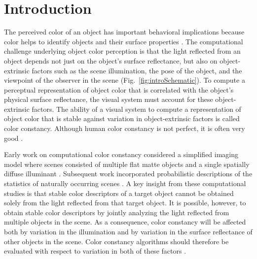 \documentclass{jov}
\begin{document}
\maketitle

\section{Introduction}
The perceived color of an object has important behavioral implications because color helps to identify objects and their surface properties \cite{Mollon89, Jacobs81}.
The computational challenge underlying object color perception is that the light reflected from an object depends not just on the object's surface reflectance, but also 
on object-extrinsic factors such as the scene illumination, the pose of the object, and the viewpoint of the observer in the scene (Fig.~\ref{fig:introSchematic}).
To compute a perceptual representation of object color that is correlated with the object's physical surface reflectance, the visual system must account for these object-extrinsic factors.
The ability of a visual system to compute a representation of object color that is stable against variation in object-extrinsic factors is called color constancy. 
Although human color constancy is not perfect, it is often very good \cite{FosterColorConstancy, BrainardColorConstancy}. 

Early work on computational color constancy considered a simplified imaging model where scenes consisted of multiple flat matte objects and a single spatially diffuse illuminant \cite{LandRetinex,Buchsbaum80,MaloneyWandell86}.
Subsequent work incorporated probabilistic descriptions of the statistics of naturally occurring scenes \cite{D'ZmuraConstancy3, D'ZmuraIversonSinger,BrainardFreeman}.
A key insight from these computational studies is that stable color descriptors of a target object cannot be obtained solely from the light reflected from that target object.
It is possible, however, to obtain stable color descriptors by jointly analyzing the light reflected from multiple objects in the scene.
As a consequence, color constancy will be affected both by variation in the illumination and by variation in the surface reflectance of other objects in the scene.  Color constancy algorithms should therefore be evaluated with respect to variation in both of these factors \cite{BrainardWandellRetinex,BrainardFreeman}. 
\end{document}
